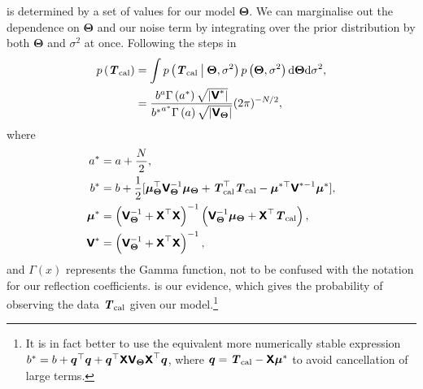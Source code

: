  is determined by a set of values for our model $\boldsymbol{\Theta}$. We can marginalise out the dependence on $\boldsymbol{\Theta}$ and our noise term by integrating over the prior distribution by both $\boldsymbol{\Theta}$ and $\sigma^2$ at once. Following the steps in \citet{banerjee}
\begin{equation}
    \begin{aligned} \label{eqn:ev}
    p\left(\y\right) &= \int p\left(\y \given[\big] \boldsymbol{\Theta}, \sigma^2\right) p\left(\boldsymbol{\Theta}, \sigma^2\right) \mathrm{d}\boldsymbol{\Theta} \mathrm{d}\sigma^2,\\
    &= \frac{b^a\Gamma\left(a^*\right)\sqrt{|\mathbfss{V}^*|}}{{b^*}^{a^*}\Gamma\left(a\right)\sqrt{|\mathbfss{V}_{\boldsymbol{\Theta}}|}}(2\pi)^{-N/2}, \\
    \end{aligned}
\end{equation}
where 
\begin{equation}\label{starred}
    \begin{aligned}   
    a^* &= a + \frac{N}{2}, \\
    b^* &= b + \frac{1}{2}[\boldsymbol{\mu}_{\boldsymbol{\Theta}}^{\top}\mathbfss{V}_{\boldsymbol{\Theta}}^{-1}\boldsymbol{\mu}_{\boldsymbol{\Theta}} + \y^{\top}\y - \boldsymbol{\mu}^{*\top}\mathbfss{V}^{*-1}\boldsymbol{\mu}^*], \\
    \boldsymbol{\mu}^* &= \left(\mathbfss{V}_{\boldsymbol{\Theta}}^{-1} + \mathbfss{X}^{\top}\mathbfss{X}\right)^{-1}\left(\mathbfss{V}_{\boldsymbol{\Theta}}^{-1}\boldsymbol{\mu}_{\boldsymbol{\Theta}} + \mathbfss{X}^{\top}\y\right), \\
    \mathbfss{V}^* &= \left(\mathbfss{V}_{\boldsymbol{\Theta}}^{-1} + \mathbfss{X}^{\top}\mathbfss{X}\right)^{-1}, \\
    \end{aligned}
\end{equation}
and $\Gamma\left(x\right)$ represents the Gamma function, not to be confused with the notation for our reflection coefficients.  is our evidence, which gives the probability of observing the data $\y$ given our model.\footnote{It is in fact better to use the equivalent more numerically stable expression
$b^*=b + \boldsymbol{q}^{\top} \boldsymbol{q} + \boldsymbol{q}^{\top} \mathbfss{X} \mathbfss{V}_{\boldsymbol{\Theta}} \mathbfss{X}^{\top} \boldsymbol{q}$,  where $\boldsymbol{q}= \y-\mathbfss{X}\boldsymbol{\mu}^*$ to avoid cancellation of large terms.}


